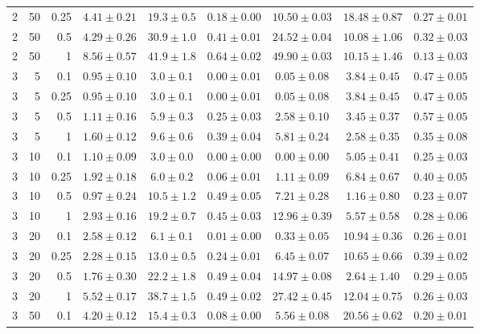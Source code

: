 \begin{table}[htbp]
\begin{tabular}{@{}rrrcccccc@{}}
2 & 50 & 0.25 & $4.41 \pm 0.21$ & $19.3 \pm 0.5$ & $0.18 \pm 0.00$ & $10.50 \pm 0.03$ & $18.48 \pm 0.87$ & $0.27 \pm 0.01$ \\
2 & 50 & 0.5 & $4.29 \pm 0.26$ & $30.9 \pm 1.0$ & $0.41 \pm 0.01$ & $24.52 \pm 0.04$ & $10.08 \pm 1.06$ & $0.32 \pm 0.03$ \\
2 & 50 & 1 & $8.56 \pm 0.57$ & $41.9 \pm 1.8$ & $0.64 \pm 0.02$ & $49.90 \pm 0.03$ & $10.15 \pm 1.46$ & $0.13 \pm 0.03$ \\
\midrule
3 & 5 & 0.1 & $0.95 \pm 0.10$ & $3.0 \pm 0.1$ & $0.00 \pm 0.01$ & $0.05 \pm 0.08$ & $3.84 \pm 0.45$ & $0.47 \pm 0.05$ \\
3 & 5 & 0.25 & $0.95 \pm 0.10$ & $3.0 \pm 0.1$ & $0.00 \pm 0.01$ & $0.05 \pm 0.08$ & $3.84 \pm 0.45$ & $0.47 \pm 0.05$ \\
3 & 5 & 0.5 & $1.11 \pm 0.16$ & $5.9 \pm 0.3$ & $0.25 \pm 0.03$ & $2.58 \pm 0.10$ & $3.45 \pm 0.37$ & $0.57 \pm 0.05$ \\
3 & 5 & 1 & $1.60 \pm 0.12$ & $9.6 \pm 0.6$ & $0.39 \pm 0.04$ & $5.81 \pm 0.24$ & $2.58 \pm 0.35$ & $0.35 \pm 0.08$ \\
3 & 10 & 0.1 & $1.10 \pm 0.09$ & $3.0 \pm 0.0$ & $0.00 \pm 0.00$ & $0.00 \pm 0.00$ & $5.05 \pm 0.41$ & $0.25 \pm 0.03$ \\
3 & 10 & 0.25 & $1.92 \pm 0.18$ & $6.0 \pm 0.2$ & $0.06 \pm 0.01$ & $1.11 \pm 0.09$ & $6.84 \pm 0.67$ & $0.40 \pm 0.05$ \\
3 & 10 & 0.5 & $0.97 \pm 0.24$ & $10.5 \pm 1.2$ & $0.49 \pm 0.05$ & $7.21 \pm 0.28$ & $1.16 \pm 0.80$ & $0.23 \pm 0.07$ \\
3 & 10 & 1 & $2.93 \pm 0.16$ & $19.2 \pm 0.7$ & $0.45 \pm 0.03$ & $12.96 \pm 0.39$ & $5.57 \pm 0.58$ & $0.28 \pm 0.06$ \\
3 & 20 & 0.1 & $2.58 \pm 0.12$ & $6.1 \pm 0.1$ & $0.01 \pm 0.00$ & $0.33 \pm 0.05$ & $10.94 \pm 0.36$ & $0.26 \pm 0.01$ \\
3 & 20 & 0.25 & $2.28 \pm 0.15$ & $13.0 \pm 0.5$ & $0.24 \pm 0.01$ & $6.45 \pm 0.07$ & $10.65 \pm 0.66$ & $0.39 \pm 0.02$ \\
3 & 20 & 0.5 & $1.76 \pm 0.30$ & $22.2 \pm 1.8$ & $0.49 \pm 0.04$ & $14.97 \pm 0.08$ & $2.64 \pm 1.40$ & $0.29 \pm 0.05$ \\
3 & 20 & 1 & $5.52 \pm 0.17$ & $38.7 \pm 1.5$ & $0.49 \pm 0.02$ & $27.42 \pm 0.45$ & $12.04 \pm 0.75$ & $0.26 \pm 0.03$ \\
3 & 50 & 0.1 & $4.20 \pm 0.12$ & $15.4 \pm 0.3$ & $0.08 \pm 0.00$ & $5.56 \pm 0.08$ & $20.56 \pm 0.62$ & $0.20 \pm 0.01$ \\

\end{tabular}
\end{table}
